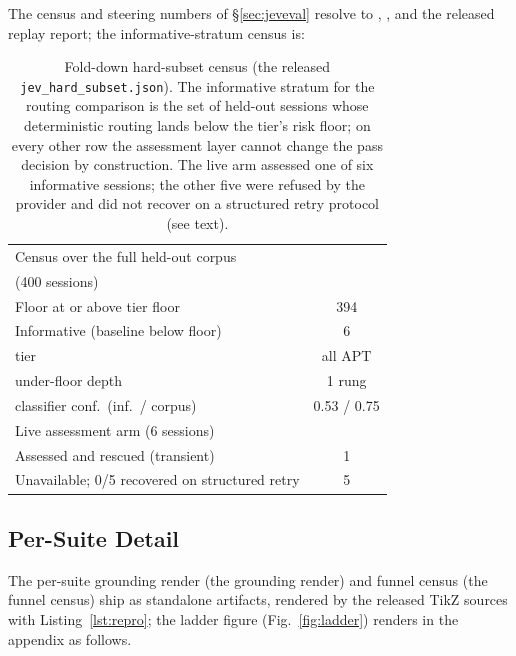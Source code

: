 The census and steering numbers of \S\ref{sec:jeveval} resolve to
, , and the
released replay report; the informative-stratum census is:
\begin{table}[h]
\centering
\caption{Fold-down hard-subset census (the released
\texttt{jev\_hard\_subset.json}). The informative stratum for the routing
comparison is the set of held-out sessions whose deterministic routing
lands below the tier's risk floor; on every other row the assessment
layer cannot change the pass decision by construction. The live arm
assessed one of six informative sessions; the other five were refused
by the provider and did not recover on a structured retry protocol
(see text).}
\label{tab:hardsunset}
\small
\setlength{\tabcolsep}{4pt}
\begin{tabular}{@{}lc@{}}
\toprule
Census over the full held-out corpus & \\
(400 sessions) & \\
\midrule
Floor at or above tier floor & 394 \\
Informative (baseline below floor) & 6 \\
\quad tier & all APT \\
\quad under-floor depth & 1 rung \\
\quad classifier conf.\ (inf.\ / corpus) & 0.53 / 0.75 \\
\midrule
Live assessment arm (6 sessions) & \\
\midrule
Assessed and rescued (transient) & 1 \\
Unavailable; 0/5 recovered on structured retry & 5 \\
\bottomrule
\end{tabular}
\end{table}

\subsection{Per-Suite Detail}
\label{app:figdetail}

The per-suite grounding render (the grounding render) and funnel
census (the funnel census) ship as standalone artifacts, rendered by
the released TikZ sources with Listing~\ref{lst:repro}; the ladder figure
(Fig.~\ref{fig:ladder}) renders in the appendix as follows.


